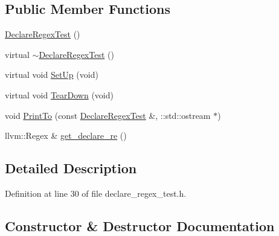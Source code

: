 \subsection*{Public Member Functions}
\begin{DoxyCompactItemize}
\item 
\hyperlink{classclang_1_1tidy_1_1pagesjaunes_1_1test_1_1_declare_regex_test_a508050ddddb3493f3a269d950a003750}{Declare\+Regex\+Test} ()
\item 
virtual \hyperlink{classclang_1_1tidy_1_1pagesjaunes_1_1test_1_1_declare_regex_test_a5957f9aae550b824c9c09a72057eec42}{$\sim$\+Declare\+Regex\+Test} ()
\item 
virtual void \hyperlink{classclang_1_1tidy_1_1pagesjaunes_1_1test_1_1_declare_regex_test_ae35e7b27f89dc217207465fe9b408b4f}{Set\+Up} (void)
\item 
virtual void \hyperlink{classclang_1_1tidy_1_1pagesjaunes_1_1test_1_1_declare_regex_test_ae2ff4360622063301d3044b15f2ea85a}{Tear\+Down} (void)
\item 
void \hyperlink{classclang_1_1tidy_1_1pagesjaunes_1_1test_1_1_declare_regex_test_ae0118e9bf5e94c7fb448d1413df7f6e7}{Print\+To} (const \hyperlink{classclang_1_1tidy_1_1pagesjaunes_1_1test_1_1_declare_regex_test}{Declare\+Regex\+Test} \&, \+::std\+::ostream $\ast$)
\item 
llvm\+::\+Regex \& \hyperlink{classclang_1_1tidy_1_1pagesjaunes_1_1test_1_1_declare_regex_test_a515196a7c837ddce10b778b7097f500c}{get\+\_\+declare\+\_\+re} ()
\end{DoxyCompactItemize}


\subsection{Detailed Description}


Definition at line 30 of file declare\+\_\+regex\+\_\+test.\+h.



\subsection{Constructor \& Destructor Documentation}
\mbox{\label{classclang_1_1tidy_1_1pagesjaunes_1_1test_1_1_declare_regex_test_a508050ddddb3493f3a269d950a003750}} 
